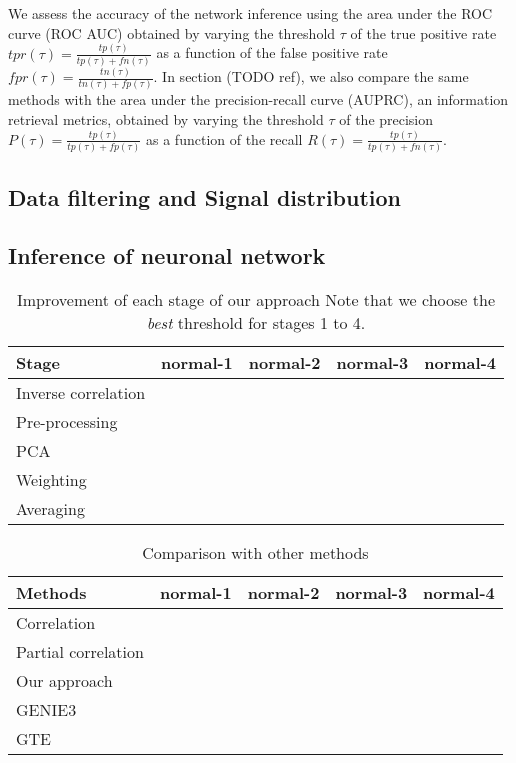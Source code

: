 \documentclass[wcp]{jmlr}
\begin{document}
We assess the accuracy of the network inference using the area under
the ROC curve (ROC AUC) obtained by varying the threshold
$\tau$ of the true positive rate $tpr(\tau) = \frac{tp(\tau)}{tp(\tau) + fn(\tau)}$
as a function of the false positive rate
$fpr(\tau) = \frac{tn(\tau)}{tn(\tau) + fp(\tau)}$. In section (TODO ref),
we also compare the same methods with the area under the precision-recall
curve (AUPRC), an information retrieval metrics, obtained by varying the threshold
$\tau$ of the precision $P(\tau) = \frac{tp(\tau)}{tp(\tau) + fp(\tau)}$
as a function of the recall $R(\tau) = \frac{tp(\tau)}{tp(\tau) + fn(\tau)}$.


\subsection{Data filtering and Signal distribution}

\subsection{Inference of neuronal network}

\begin{table}[htb]
\centering
\caption{Improvement of each stage of our approach Note that we choose the
         \textit{best} threshold for stages 1 to 4.}
\begin{tabular}{*{5}{l}}
\toprule
Stage               & normal-1 & normal-2 & normal-3 & normal-4 \\
\midrule
Inverse correlation & & & & \\
Pre-processing      & & & & \\
PCA                 & & & & \\
Weighting           & & & & \\
Averaging           & & & & \\
\bottomrule
\end{tabular}
\end{table}


\begin{table}[htb]
\centering
\caption{Comparison with other methods}
\begin{tabular}{*{5}{l}}
\toprule
Methods             & normal-1 & normal-2 & normal-3 & normal-4 \\
\midrule
Correlation         & & & & \\
Partial correlation & & & & \\
Our approach        & & & & \\
GENIE3              & & & & \\
GTE                 & & & & \\
\bottomrule
\end{tabular}
\end{table}
\end{document}
